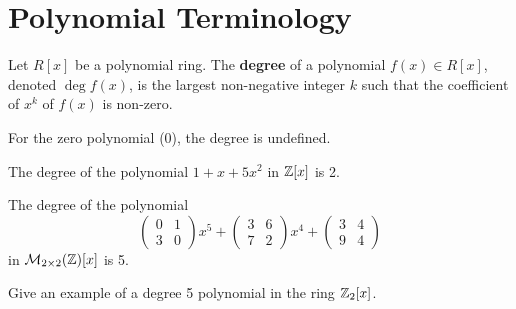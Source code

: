 \section{Polynomial Terminology}
\begin{definition}
    Let $R[x]$ be a polynomial ring. The \textbf{degree} of a polynomial $f(x) \in R[x]$, denoted $\deg f(x)$, is the largest non-negative integer $k$ such that the coefficient of $x^k$ of $f(x)$ is non-zero.
\end{definition}
\begin{remark}
    For the zero polynomial (0), the degree is undefined.
\end{remark}
\begin{example}
    The degree of the polynomial $1+x+5x^2$ in $\mathbb{Z}[x]$ is 2.
\end{example}
\begin{example}
    The degree of the polynomial
    \[
        \begin{pmatrix}0&1\\3&0\end{pmatrix}x^5 + \begin{pmatrix}3&6\\7&2\end{pmatrix}x^4 + \begin{pmatrix}3&4\\9&4\end{pmatrix}
    \]
    in $\mathcal{M}_{2\times2}(\mathbb{Z})[x]$ is 5.
\end{example}
\begin{exercise}
    Give an example of a degree 5 polynomial in the ring $\mathbb{Z}_2[x]$.
\end{exercise}

